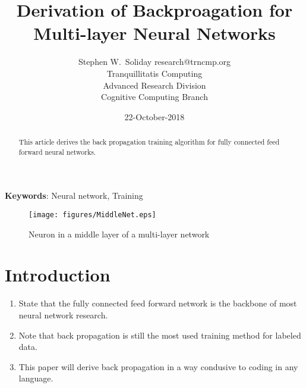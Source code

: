 \documentclass{article}
\begin{document}
\title{Derivation of Backproagation for Multi-layer Neural Networks}
\author{ \name Stephen W.~Soliday \email research@trncmp.org \\
  \addr Tranquillitatis Computing \\
  \addr Advanced Research Division\\
  \addr Cognitive Computing Branch \\
}
\date{22-October-2018}

\maketitle

\begin{abstract}%

  This article derives the back propagation training algorithm for fully
  connected feed forward neural networks.
  
\end{abstract}

\vspace{12pt}
\textbf{Keywords}: Neural network, Training

\begin{figure}[h]
  \begin{center}
    \texttt{[image: figures/MiddleNet.eps]}
    \caption{Neuron in a middle layer of a multi-layer network}
    \label{fig:midlayer}
  \end{center}
\end{figure}

\section{Introduction\label{sec:intro}}

\begin{enumerate}
  
\item State that the fully connected feed forward network is the
      backbone of most neural network research.
\item Note that back propagation is still the most used training
      method for labeled data.
\item This paper will derive back propagation in a way condusive
      to coding in any language.
\end{enumerate}
\end{document}
